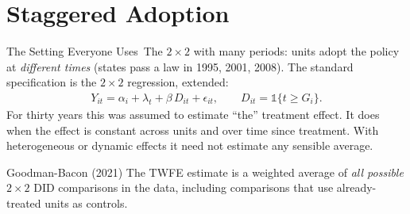 \documentclass[aspectratio=169,11pt,xcolor=dvipsnames]{beamer}
\newcommand{\core}{\,\raisebox{0.6pt}{\textcolor{corestar}{$\bigstar$}}}
\begin{document}
\section[Staggered]{Staggered Adoption}
\begin{frame}\sectionpage\end{frame}

\begin{frame}{The Setting Everyone Uses\core}
The $2\times2$ with many periods: units adopt the policy at \emph{different times} (states pass
a law in 1995, 2001, 2008). The standard specification is the $2\times2$ regression, extended:
\begin{align*}
  Y_{it} = \alpha_i + \lambda_t + \beta\, D_{it} + \epsilon_{it},
  \qquad D_{it} = \mathds{1}\{t \geq G_i\} .
\end{align*}
\vskip3pt
For thirty years this was assumed to estimate ``the'' treatment effect. It does
when the effect is \alert{constant across units and over time since treatment}.
With heterogeneous or dynamic effects it need not estimate any sensible
average.
\vskip4pt
\begin{alertblock}{Goodman-Bacon (2021)}
The TWFE estimate is a weighted average of \emph{all possible} $2\times2$ DID
comparisons in the data, including comparisons that use
\alert{already-treated units as controls}.
\end{alertblock}
\end{frame}
\end{document}
